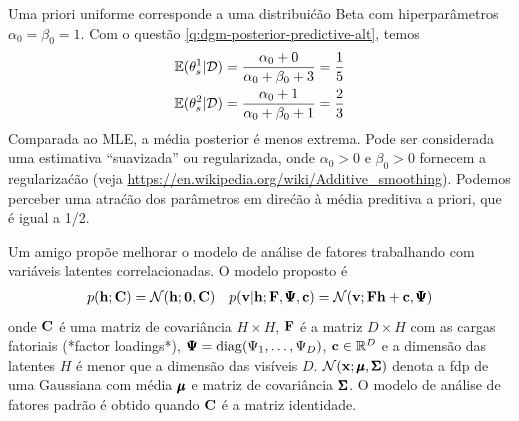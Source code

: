 \begin{exenumerate}
    \begin{solution}
        Uma priori uniforme corresponde a uma distribui\'c\~ao Beta com
        hiperpar\^ametros $\alpha_0=\beta_0=1$. Com o
         quest\~ao
        \ref{q:dgm-posterior-predictive-alt}, temos
        \begin{align}
            \mathbb{E}(\theta_s^1 | \mathcal{D}) & = \frac{\alpha_0+0}{\alpha_0+\beta_0+3} = \frac{1}{5}\\
            \mathbb{E}(\theta_s^2 | \mathcal{D}) & = \frac{\alpha_0+1}{\alpha_0+\beta_0+1} = \frac{2}{3}
        \end{align}
        Comparada ao MLE, a m\'edia posterior \'e menos extrema. Pode ser
        considerada uma estimativa ``suavizada'' ou regularizada, onde
        $\alpha_0 > 0$ e $\beta_0 > 0$ fornecem a regulariza\'c\~ao (veja
        \url{https://en.wikipedia.org/wiki/Additive_smoothing}). Podemos
        perceber uma atra\'c\~ao dos par\^ametros em dire\'c\~ao \`a m\'edia preditiva a priori,
        que \'e igual a 1/2.
        
    \end{solution}
    
\end{exenumerate}


\label{ex:FA-alt}

Um amigo prop\~oe melhorar o modelo de an\'alise de fatores
trabalhando com vari\'aveis latentes correlacionadas. O modelo proposto \'e
\begin{align}
    p(\mathbf{h}; \mathbf{C}) &= \mathcal{N}(\mathbf{h}; \boldsymbol{0}, \mathbf{C}) & p(\mathbf{v} | \mathbf{h}; \mathbf{F}, \pmb{\Psi}, \mathbf{c}) = \mathcal{N}(\mathbf{v}; \mathbf{F} \mathbf{h}+\mathbf{c}, \pmb{\Psi})
\end{align}
onde $\mathbf{C}$ \'e uma matriz de covari\^ancia $H \times H$, $\mathbf{F}$ \'e a matriz $D
\times H$ com as cargas fatoriais (*factor loadings*), $\pmb{\Psi}=\operatorname{diag}(\Psi_1,
\ldots, \Psi_D)$, $\mathbf{c}\in \mathbb{R}^D$ e a dimens\~ao das
latentes $H$ \'e menor que a dimens\~ao das vis\'iveis
$D$. $\mathcal{N}(\mathbf{x}; \pmb{\mu}, \pmb{\Sigma})$ denota a fdp de uma Gaussiana com
m\'edia $\pmb{\mu}$ e matriz de covari\^ancia $\pmb{\Sigma}$. O modelo de an\'alise de fatores padr\~ao \'e obtido quando $\mathbf{C}$ \'e a matriz identidade.

